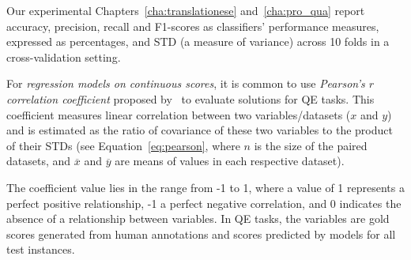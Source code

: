 Our experimental Chapters~\ref{cha:translationese} and~\ref{cha:pro_qua} report accuracy, precision, recall and F1-scores as classifiers' performance measures, expressed as percentages, and \gls{STD} (a measure of variance) across 10 folds in a cross-validation setting.


For \textit{regression models on continuous scores}, it is common to use \textit{Pearson's $r$ correlation coefficient} proposed by~\cite{Graham2015r} to evaluate solutions for QE tasks. This coefficient measures linear correlation between two variables/datasets ($x$ and $y$) and is estimated as the ratio of covariance of these two variables to the product of their \gls{STD}s (see Equation~\ref{eq:pearson}, where $n$ is the size of the paired datasets, and $\overline{x}$ and $\overline{y}$ are means of values in each respective dataset). %



The coefficient value lies in the range from -1 to 1, where a value of 1 represents a perfect positive relationship, -1 a perfect negative correlation, and 0 indicates the absence of a relationship between variables. 
In QE tasks, the variables are gold scores generated from human annotations and scores predicted by models for all test instances. 

